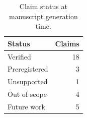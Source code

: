 \begin{table}[t]
\caption{Claim status at manuscript generation time.}
\label{tab:claim-status}
\centering
\begin{tabular}{lr}
\toprule Status & Claims \\ \midrule
Verified & 18 \\
Preregistered & 3 \\
Unsupported & 1 \\
Out of scope & 4 \\
Future work & 5 \\
\bottomrule\end{tabular}
\end{table}
